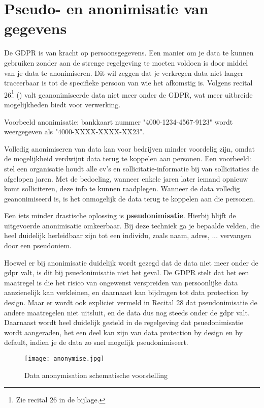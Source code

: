 \section{Pseudo- en anonimisatie van gegevens}
De GDPR is van kracht op persoonsgegevens. Een manier om je data te kunnen gebruiken zonder aan de strenge regelgeving te moeten voldoen is door middel van je data te anonimiseren. Dit wil zeggen dat je verkregen data niet langer traceerbaar is tot de specifieke persoon van wie het afkomstig is. Volgens recital 26\footnote{Zie recital 26 in de bijlage.} (\textcite{Europe2016}) valt geanonimiseerde data niet meer onder de GDPR, wat meer uitbreide mogelijkheden biedt voor verwerking. 

Voorbeeld anonimisatie: bankkaart nummer "4000-1234-4567-9123" wordt weergegeven als "4000-XXXX-XXXX-XX23". 

Volledig anonimiseren van data kan voor bedrijven minder voordelig zijn, omdat de mogelijkheid verdwijnt data terug te koppelen aan personen. Een voorbeeld: stel een organisatie houdt alle cv's en sollicitatie-informatie bij van sollicitaties de afgelopen jaren.
 Met de bedoeling, wanneer enkele jaren later iemand opnieuw komt solliciteren, deze info te kunnen raadplegen. Wanneer de data volledig geanonimiseerd is, is het onmogelijk de data terug te koppelen aan die personen. 
 
Een iets minder drastische oplossing is \textbf{pseudonimisatie}. Hierbij blijft de uitgevoerde anonimisatie omkeerbaar.  
Bij deze techniek ga je bepaalde velden, die heel duidelijk herleidbaar zijn tot een individu, zoals naam, adres, ... vervangen door een pseudoniem.

Hoewel er bij anonimisatie duidelijk wordt gezegd dat de data niet meer onder de gdpr valt, is dit bij psuedonimisatie niet het geval. De GDPR stelt dat het een maatregel is die het risico van ongewenst verspreiden van persoonlijke data aanzienelijk kan verkleinen, en daarnaast kan bijdragen tot data protection by design. Maar er wordt ook expliciet vermeld in Recital 28 dat pseudonimisatie de andere maatregelen niet uitsluit, en de data dus nog steeds onder de gdpr valt. 
Daarnaast wordt heel duidelijk gesteld in de regelgeving dat psuedonimisatie wordt aangeraden, het een deel kan zijn van data protection by design en by default, indien je de data zo snel mogelijk pseudonimiseert. 

\begin{figure}[h]
	\texttt{[image: anonymise.jpg]}
	\caption{Data anonymisation schematische voorstelling \textcite{MadronaVentureLabs2017}}
\end{figure} 

